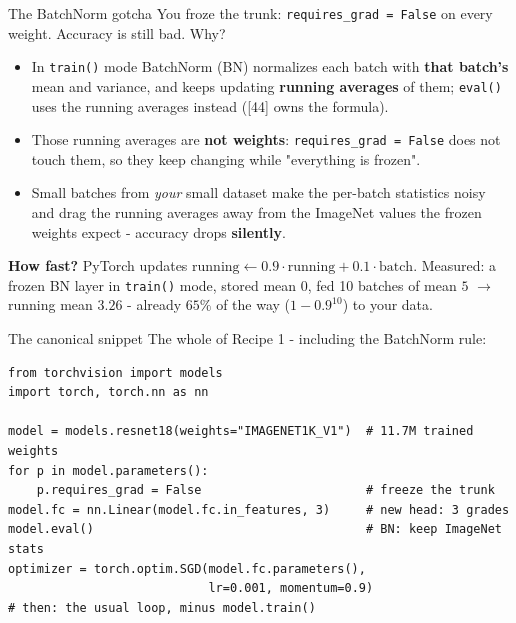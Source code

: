 \documentclass[aspectratio=169]{beamer}
\begin{document}
\begin{frame}{The BatchNorm gotcha}
  You froze the trunk: \texttt{requires\_grad = False} on every weight. Accuracy is
  still bad. Why?
  \vskip 6pt
  \begin{itemize}\small
    \item In \texttt{train()} mode BatchNorm (BN) normalizes each batch with \textbf{that
      batch's} mean and variance, and keeps updating \textbf{running averages} of them;
      \texttt{eval()} uses the running averages instead ([44] owns the formula).
    \item Those running averages are \textbf{not weights}: \texttt{requires\_grad =
      False} does not touch them, so they keep changing while "everything is frozen".
    \item Small batches from \emph{your} small dataset make the per-batch statistics noisy
      and drag the running averages away from the ImageNet values the frozen weights
      expect - accuracy drops \textbf{silently}.
  \end{itemize}
  \vskip 2pt
  {\small \textbf{How fast?} PyTorch updates
  $\text{running} \leftarrow 0.9\cdot\text{running} + 0.1\cdot\text{batch}$. Measured: a
  frozen BN layer in \texttt{train()} mode, stored mean $0$, fed 10 batches of mean $5$
  $\to$ running mean $3.26$ - already $65\%$ of the way ($1-0.9^{10}$) to your data.}
  \vskip 8pt
\end{frame}

\begin{frame}[fragile]{The canonical snippet}
  The whole of Recipe 1 - including the BatchNorm rule:
\begin{lstlisting}
from torchvision import models
import torch, torch.nn as nn

model = models.resnet18(weights="IMAGENET1K_V1")  # 11.7M trained weights
for p in model.parameters():
    p.requires_grad = False                       # freeze the trunk
model.fc = nn.Linear(model.fc.in_features, 3)     # new head: 3 grades
model.eval()                                      # BN: keep ImageNet stats
optimizer = torch.optim.SGD(model.fc.parameters(),
                            lr=0.001, momentum=0.9)
# then: the usual loop, minus model.train()
\end{lstlisting}
  \vskip 2pt
  \vskip 3pt
\end{frame}
\end{document}
